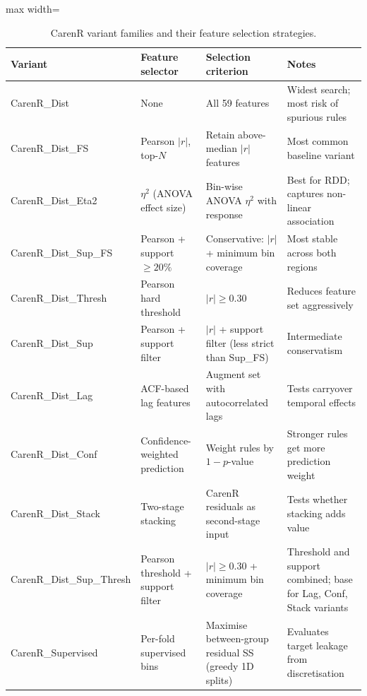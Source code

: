 \begin{table}[htbp]
  \centering
  \caption{CarenR variant families and their feature selection strategies.}\label{tab:ch3a_3}
  \small
  \begin{adjustbox}{max width=\textwidth}
    \begin{tabularx}{\textwidth}{>{\ttfamily}p{5cm} p{3.5cm} X p{3cm}}
    \toprule
    \normalfont\textbf{Variant} & \textbf{Feature selector} & \textbf{Selection criterion} & \textbf{Notes} \\
    \midrule
    CarenR\_Dist
      & None
      & All 59 features
      & Widest search; most risk of spurious rules \\[4pt]
    CarenR\_Dist\_FS
      & Pearson $|r|$, top-$N$
      & Retain above-median $|r|$ features
      & Most common baseline variant \\[4pt]
    CarenR\_Dist\_Eta2
      & $\eta^2$ (ANOVA effect size)
      & Bin-wise ANOVA $\eta^2$ with response
      & Best for RDD; captures non-linear association \\[4pt]
    CarenR\_Dist\_Sup\_FS
      & Pearson + support $\geq 20\%$
      & Conservative: $|r|$ + minimum bin coverage
      & Most stable across both regions \\[4pt]
    CarenR\_Dist\_Thresh
      & Pearson hard threshold
      & $|r| \geq 0.30$
      & Reduces feature set aggressively \\[4pt]
    CarenR\_Dist\_Sup
      & Pearson + support filter
      & $|r|$ + support filter (less strict than Sup\_FS)
      & Intermediate conservatism \\[4pt]
    CarenR\_Dist\_Lag
      & ACF-based lag features
      & Augment set with autocorrelated lags
      & Tests carryover temporal effects \\[4pt]
    CarenR\_Dist\_Conf
      & Confidence-weighted prediction
      & Weight rules by $1 - p$-value
      & Stronger rules get more prediction weight \\[4pt]
    CarenR\_Dist\_Stack
      & Two-stage stacking
      & CarenR residuals as second-stage input
      & Tests whether stacking adds value \\[4pt]
    CarenR\_Dist\_Sup\_Thresh
      & Pearson threshold + support filter
      & $|r| \geq 0.30$ + minimum bin coverage
      & Threshold and support combined; base for Lag, Conf, Stack variants \\[4pt]
    CarenR\_Supervised
      & Per-fold supervised bins
      & Maximise between-group residual SS (greedy 1D splits)
      & Evaluates target leakage from discretisation \\
    \bottomrule
  \end{tabularx}
  \end{adjustbox}

\end{table}


